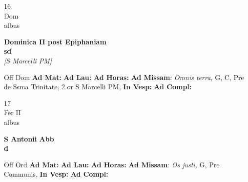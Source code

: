 \documentclass[10pt, openany]{book}
\begin{document}
        \begin{center}
            \begin{minipage}{3.5in}
                \vspace{2em}
                \begin{minipage}{0.5in}
                    {\Huge 16} \\
                    {\normalsize Dom} \\
                    {\normalsize albus}
                \end{minipage}
                \begin{minipage}{3.0in}
                    \textbf{ \large Dominica II post Epiphaniam \\
                    \textnormal{\normalsize sd}} \\ \textit{[S Marcelli PM]} \\ 
                \end{minipage}
                \begin{justify}Off Dom
                    \textbf{Ad Mat: }
                    \textbf{Ad Lau: }
                    \textbf{Ad Horas: }\textbf{Ad Missam}: \textit{Omnis terra,} G, C, Pre de Ssma Trinitate, 2 or S Marcelli PM,  
                    \textbf{In Vesp: }
                    \textbf{Ad Compl: }
                \end{justify}
            \end{minipage}
        \end{center}
    
        \begin{center}
            \begin{minipage}{3.5in}
                \vspace{2em}
                \begin{minipage}{0.5in}
                    {\Huge 17} \\
                    {\normalsize Fer II} \\
                    {\normalsize albus}
                \end{minipage}
                \begin{minipage}{3.0in}
                    \textbf{ \large S Antonii Abb \\
                    \textnormal{\normalsize d}} \\ 
                \end{minipage}
                \begin{justify}Off Ord
                    \textbf{Ad Mat: }
                    \textbf{Ad Lau: }
                    \textbf{Ad Horas: }\textbf{Ad Missam}: \textit{Os justi,} G, Pre Communis,  
                    \textbf{In Vesp: }
                    \textbf{Ad Compl: }
                \end{justify}
            \end{minipage}
        \end{center}
    
\end{document}
